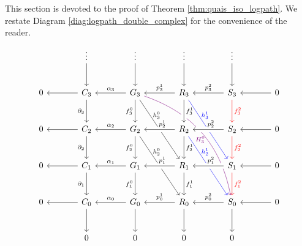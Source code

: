 \documentclass[a4paper,UKenglish,cleveref,nolineno,autoref]{socg-lipics-v2021}
\begin{document}
This section is devoted to the proof of Theorem \ref{thm:quais_iso_logpath}. We restate Diagram \ref{diag:logpath_double_complex} for the convenience of the reader.
\begin{equation} \label{eq:diagram_logpath_app}
\begin{tikzcd} [column sep=large,row sep=large]
& \vdots \arrow[d] & \vdots \arrow[d] & \vdots \arrow[d] & \vdots \arrow[d] \\
0 & C_3 \arrow[l] \arrow[d,swap,"\partial_3"] & G_3 \arrow[l,swap,"\alpha_3"] \arrow[d,swap,"f_3^0"] \arrow[ddr,"h_3^0"{xshift=-10pt,yshift=10pt}] \arrow[dddrr,violet,bend left,"H_3^0"{xshift=-10pt,yshift=-14pt}] & R_3 \arrow[l,swap,"p_3^1"] \arrow[d,crossing over,"f_3^1"] \arrow[ddr,blue,"h_3^1"{xshift=-10pt,yshift=10pt}] & S_3 \arrow[l,swap,"p^2_3"] \arrow[d,red,"f_3^2"] & 0 \arrow[l] \\
0 & C_2 \arrow[l] \arrow[d,swap,"\partial_2"] & G_2 \arrow[l,swap,"\alpha_2"] \arrow[d,swap,"f_2^0"] \arrow[ddr,"h_2^0"{xshift=-10pt,yshift=10pt}] & R_2 \arrow[l,swap,"p_2^1"{xshift=3pt},crossing over] \arrow[d,"f_2^1"] \arrow[ddr,blue,"h_2^1"{xshift=-10pt,yshift=10pt}] & S_2 \arrow[l,swap,"p^2_2"{xshift=3pt},crossing over] \arrow[d,red,"f_2^2"] & 0 \arrow[l] \\
0 & C_1 \arrow[l] \arrow[d,swap,"\partial_1"] & G_1 \arrow[l,swap,"\alpha_1"] \arrow[d,swap,"f_1^0"] & R_1 \arrow[l,swap,"p_1^1"{xshift=3pt},crossing over] \arrow[d,"f_1^1"] & S_1 \arrow[l,swap,"p^2_1"{xshift=3pt},crossing over] \arrow[d,red,"f_1^2"] & 0 \arrow[l] \\
0 & C_0 \arrow[l] \arrow[d] & G_0 \arrow[l,swap,"\alpha_0"] \arrow[d] & R_0 \arrow[l,swap,"p_0^1"] \arrow[d] & S_0 \arrow[l,swap,"p^2_0"] \arrow [d]& 0 \arrow[l] \\
& 0 & 0 & 0 & 0
\end{tikzcd}
\end{equation} 
\end{document}
